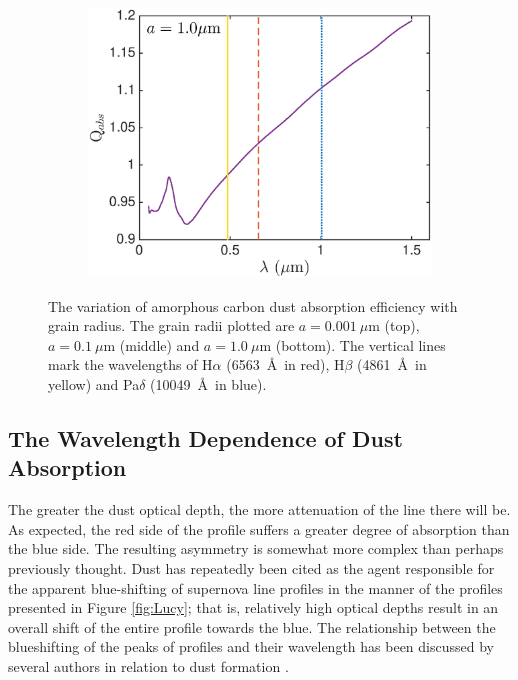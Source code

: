 \begin{figure}
\begin{subfigure}{\textwidth}
\centering
\includegraphics[trim =0 0 45 15,clip=true,scale=0.5]{chapters/chapter4/images/Qabs_a1_0}
\end{subfigure}
\caption{The variation of amorphous carbon dust absorption efficiency with grain radius. The grain radii plotted are $a=0.001~\mu$m (top), $a=0.1~\mu$m (middle) and $a=1.0~\mu$m (bottom).  The vertical lines mark the wavelengths of H$\alpha$ (6563~\AA\ in red), H$\beta$ (4861~\AA\ in yellow) and Pa$\delta$ (10049~\AA\ in blue).}
\label{wav_dep2}
\end{figure}






\subsection{The Wavelength Dependence of Dust Absorption}
\label{asym}
The greater the dust optical depth, the more attenuation of the line 
there will be.  As expected, the red side of the profile suffers a greater 
degree of absorption than the blue side.  The resulting asymmetry is 
somewhat more complex than perhaps previously thought.  Dust has 
repeatedly been cited as the agent responsible for the apparent 
blue-shifting of supernova line profiles in the manner of the profiles 
presented in Figure \ref{fig:Lucy}; that is, relatively high optical 
depths result in an overall shift of the entire profile towards the blue.
 The relationship between the blueshifting of the peaks 
of profiles and their wavelength has been discussed by several authors in 
relation to dust formation \citep{Smith2012, Fransson2014, Gall2014}.  
  
